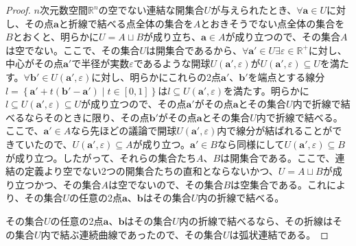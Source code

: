 \documentclass[dvipdfmx]{jsarticle}
\begin{document}
\begin{proof}
$n$次元数空間$\mathbb{R}^{n}$の空でない連結な開集合$U$が与えられたとき、$\forall\mathbf{a} \in U$に対し、その点$\mathbf{a}$と折線で結べる点全体の集合を$A$とおきそうでない点全体の集合を$B$とおくと、明らかに$U = A \sqcup B$が成り立ち、$\mathbf{a} \in A$が成り立つので、その集合$A$は空でない。ここで、その集合$U$は開集合であるから、$\forall\mathbf{a}' \in U\exists\varepsilon \in \mathbb{R}^{+}$に対し、中心がその点$\mathbf{a}'$で半径が実数$\varepsilon$であるような開球$U\left( \mathbf{a}',\varepsilon \right)$が$U\left( \mathbf{a}',\varepsilon \right) \subseteq U$を満たす。$\forall\mathbf{b}' \in U\left( \mathbf{a}',\varepsilon \right)$に対し、明らかにこれらの2点$\mathbf{a}'$、$\mathbf{b}'$を端点とする線分$l = \left\{ \mathbf{a}' + t\left( \mathbf{b}' - \mathbf{a}' \right) \middle| t \in [ 0,1] \right\}$は$l \subseteq U\left( \mathbf{a}',\varepsilon \right)$を満たす。明らかに$l \subseteq U\left( \mathbf{a}',\varepsilon \right) \subseteq U$が成り立つので、その点$\mathbf{a}'$がその点$\mathbf{a}$とその集合$U$内で折線で結べるならそのときに限り、その点$\mathbf{b}'$がその点$\mathbf{a}$とその集合$U$内で折線で結べる。ここで、$\mathbf{a}' \in A$なら先ほどの議論で開球$U\left( \mathbf{a}',\varepsilon \right)$内で線分が結ばれることができていたので、$U\left( \mathbf{a}',\varepsilon \right) \subseteq A$が成り立つ。$\mathbf{a}' \in B$なら同様にして$U\left( \mathbf{a}',\varepsilon \right) \subseteq B$が成り立つ。したがって、それらの集合たち$A$、$B$は開集合である。ここで、連結の定義より空でない2つの開集合たちの直和とならないかつ、$U = A \sqcup B$が成り立つかつ、その集合$A$は空でないので、その集合$B$は空集合である。これにより、その集合$U$の任意の2点$\mathbf{a}$、$\mathbf{b}$はその集合$U$内の折線で結べる。\par
その集合$U$の任意の2点$\mathbf{a}$、$\mathbf{b}$はその集合$U$内の折線で結べるなら、その折線はその集合$U$内で結ぶ連続曲線であったので、その集合$U$は弧状連結である。\par

\end{proof}
\end{document}
